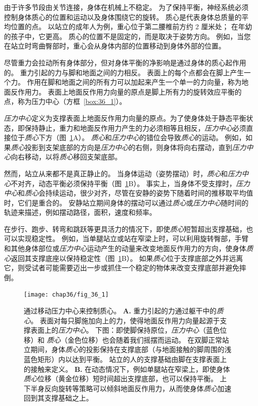 由于许多节段由关节连接，身体在机械上不稳定。
为了保持平衡，神经系统必须控制身体质心的位置和运动以及身体围绕它的旋转。
质心是代表身体总质量的平均位置的点。
以站立的成年人为例，重心位于第二腰椎前方约 2 厘米处；
在年幼的孩子中，它更高。
质心的位置不是固定的，而是取决于姿势方向。
例如，当您在站立时弯曲臀部时，重心会从身体内部的位置移动到身体外部的位置。


尽管重力会拉动所有身体部分，但对身体平衡的净影响是通过身体的质心起作用的。
重力引起的力与脚和地面之间的力相反。
表面上的每个点都会在脚上产生一个力。
作用在脚和地面之间的所有力可以加起来产生一个单一的力向量，称为地面反作用力。
表面上地面反作用力向量的原点是脚上所有力的旋转效应平衡的点，称为压力中心（方框~\ref{box:36_1}）。



\begin{proposition}[神经解剖学导航术语] \label{box:36_1}
	
	\quad \quad \textit{压力中心}定义为支撑表面上地面反作用力向量的原点。为了使身体处于静态平衡状态，即保持静止，重力和地面反作用力产生的力必须相等且相反，\textit{压力中心}必须直接位于\textit{质心}下方（图~\ref{fig:36_1}A）。
	\textit{质心}和\textit{压力中心}的错位会导致\textit{质心}的运动。
	例如，如果\textit{质心}投影到支架底部的方向是\textit{压力中心}的右侧，则身体将向右摆动，直到\textit{压力中心}向右移动，以将\textit{质心}移回支架底部。
	
	\quad \quad 然而，站立从来都不是真正静止的。
	当身体运动（姿势摆动）时，\textit{质心}和\textit{压力中心}不对齐，动态平衡必须保持平衡（图~\ref{fig:36_1}B）。
	事实上，当身体不受支撑时，\textit{压力中心}和\textit{质心}会持续运动，很少对齐，尽管在安静的姿势下随着时间的推移取平均值时，它们是重合的。
	安静站立期间身体的摆动可以通过\textit{质心}或\textit{压力中心}随时间的轨迹来描述，例如摆动路径，面积，速度和频率。
	
	\quad \quad 在步行、跑步、转弯和跳跃等更具活力的情况下，即使\textit{质心}短暂超出支撑基础，也可以实现稳定性。
	例如，当单腿站立或站在窄梁上时，可以利用旋转臀部，手臂和其他身体部位或\textit{压力中心}运动产生的动量来改变地面反作用力的方向，使身体\textit{质心}返回其支撑底座以保持稳定性（图~\ref{fig:36_1}B）。
	如果\textit{质心}位于支撑底部之外并远离它，则受试者可能需要迈出一步或抓住一个稳定的物体来改变支撑底部并避免摔倒。
	
\end{proposition}


\begin{figure}[htbp]
	\centering
	\texttt{[image: chap36/fig\_36\_1]}
	\caption{通过移动压力中心来控制质心。
		\textbf{A.} 重力引起的力通过躯干中的\textit{质心}。 
		表面对每只脚施加向上的力，使得地面反作用力向量起源于支撑表面上的\textit{压力中心}。 
		下图：即使脚保持原位，\textit{压力中心}（蓝色位移）和 \textit{质心}（金色位移）也会随着我们摇摆而运动。
		在双脚正常站立期间，身体\textit{质心}的投影保持在支撑底部（与地面接触的脚周围的浅蓝色矩形）内以达到平衡。
		站立的人的支撑基础由脚在支撑表面上的接触来定义。
		\textbf{B.} 在动态情况下，例如单腿站在窄梁上，即使身体\textit{质心}位移（黄金位移）短时间超出支撑底部，也可以保持平衡。
		上下半身反向旋转等策略可以倾斜地面反作用力，从而使身体\textit{质心}加速回到其支撑基础之上\cite{otten1999balancing}。}
	\label{fig:36_1}
\end{figure}


